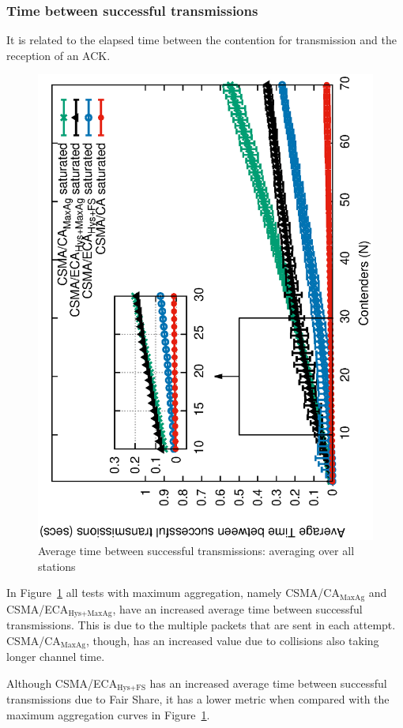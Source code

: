 	\subsubsection{Time between successful transmissions}\label{timeBetweenSxTx}
	It is related to the elapsed time between the contention for transmission and the reception of an ACK.

	\begin{figure}[tb]
		\centering
		\includegraphics[width=0.7\linewidth,angle=-90]{figures/saturated/timeBetweenSxTx-sat/timeBetweenSxTx-multiplot-sat-TON.eps}
		\caption{Average time between successful transmissions: averaging over all stations}
		\label{fig:serviceTime-sat}
	\end{figure}
	
	In Figure~\ref{fig:serviceTime-sat} all tests with maximum aggregation, namely CSMA/CA$_{\text{MaxAg}}$ and CSMA/ECA$_{\text{Hys+MaxAg}}$, have an increased average time between successful transmissions. This is due to the multiple packets that are sent in each attempt. CSMA/CA$_{\text{MaxAg}}$, though, has an increased value due to collisions also taking longer channel time.
	
	Although CSMA/ECA$_{\text{Hys+FS}}$ has an increased average time between successful transmissions due to Fair Share, it has a lower metric when compared with the maximum aggregation curves in Figure~\ref{fig:serviceTime-sat}.


